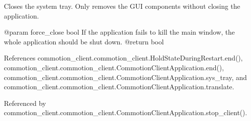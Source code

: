 \begin{DoxyVerb}Closes the system tray. Only removes the GUI components without closing the application.

@param force_close bool If the application fails to kill the main window, the whole application should be shut down.
@return bool 
\end{DoxyVerb}
 

References commotion\+\_\+client.\+commotion\+\_\+client.\+Hold\+State\+During\+Restart.\+end(), commotion\+\_\+client.\+commotion\+\_\+client.\+Commotion\+Client\+Application.\+end(), commotion\+\_\+client.\+commotion\+\_\+client.\+Commotion\+Client\+Application.\+sys\+\_\+tray, and commotion\+\_\+client.\+commotion\+\_\+client.\+Commotion\+Client\+Application.\+translate.



Referenced by commotion\+\_\+client.\+commotion\+\_\+client.\+Commotion\+Client\+Application.\+stop\+\_\+client().


